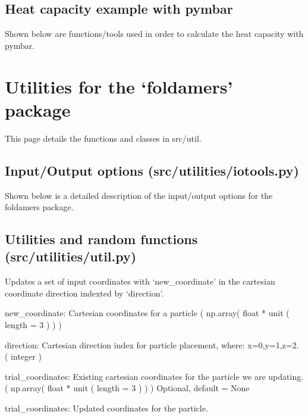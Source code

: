 \documentclass[letterpaper,10pt,english,openany,oneside]{sphinxmanual}
\begin{document}
\section{Heat capacity example with pymbar}
\label{\detokenize{thermo:heat-capacity-example-with-pymbar}}
Shown below are functions/tools used in order to calculate
the heat capacity with pymbar.


\chapter{Utilities for the ‘foldamers’ package}
\label{\detokenize{util:utilities-for-the-foldamers-package}}\label{\detokenize{util::doc}}
This page details the functions and classes in src/util.


\section{Input/Output options (src/utilities/iotools.py)}
\label{\detokenize{util:input-output-options-src-utilities-iotools-py}}
Shown below is a detailed description of the input/output
options for the foldamers package.

\label{\detokenize{util:module-iotools}}

\section{Utilities and random functions (src/utilities/util.py)}
\label{\detokenize{util:module-util}}\label{\detokenize{util:utilities-and-random-functions-src-utilities-util-py}}

\begin{fulllineitems}
\label{\detokenize{util:util.append_position}}
Updates a set of input coordinates with ‘new\_coordinate’ in the
cartesian coordinate direction indexted by ‘direction’.

new\_coordinate: Cartesian coordinates for a particle
( np.array( float * unit ( length = 3 ) ) )

direction: Cartesian direction index for particle placement, 
where: x=0,y=1,z=2. 
( integer )

trial\_coordinates: Existing cartesian coordinates for the particle
we are updating.
( np.array( float * unit ( length = 3 ) ) )
Optional, default = None

trial\_coordinates: Updated coordinates for the particle.

\end{fulllineitems}
\end{document}
